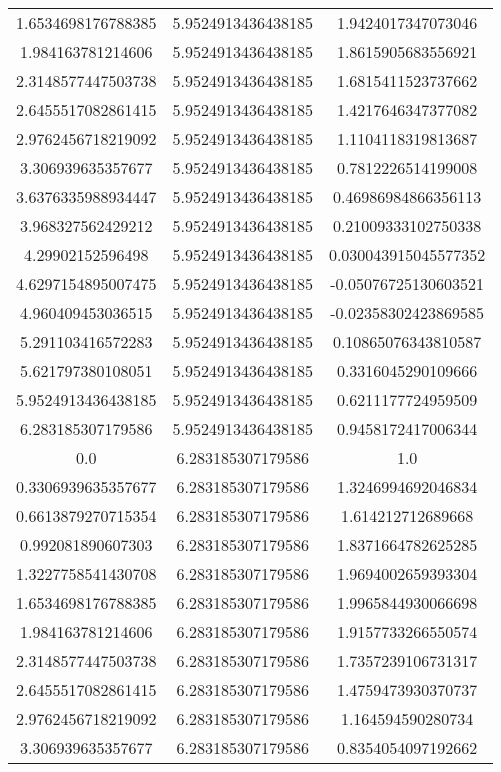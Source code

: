 \begin{table}
\begin{tabular}{ccc}
1.6534698176788385 & 5.9524913436438185 & 1.9424017347073046 \\
1.984163781214606 & 5.9524913436438185 & 1.8615905683556921 \\
2.3148577447503738 & 5.9524913436438185 & 1.6815411523737662 \\
2.6455517082861415 & 5.9524913436438185 & 1.4217646347377082 \\
2.9762456718219092 & 5.9524913436438185 & 1.1104118319813687 \\
3.306939635357677 & 5.9524913436438185 & 0.7812226514199008 \\
3.6376335988934447 & 5.9524913436438185 & 0.46986984866356113 \\
3.968327562429212 & 5.9524913436438185 & 0.21009333102750338 \\
4.29902152596498 & 5.9524913436438185 & 0.030043915045577352 \\
4.6297154895007475 & 5.9524913436438185 & -0.05076725130603521 \\
4.960409453036515 & 5.9524913436438185 & -0.02358302423869585 \\
5.291103416572283 & 5.9524913436438185 & 0.10865076343810587 \\
5.621797380108051 & 5.9524913436438185 & 0.3316045290109666 \\
5.9524913436438185 & 5.9524913436438185 & 0.6211177724959509 \\
6.283185307179586 & 5.9524913436438185 & 0.9458172417006344 \\
0.0 & 6.283185307179586 & 1.0 \\
0.3306939635357677 & 6.283185307179586 & 1.3246994692046834 \\
0.6613879270715354 & 6.283185307179586 & 1.614212712689668 \\
0.992081890607303 & 6.283185307179586 & 1.8371664782625285 \\
1.3227758541430708 & 6.283185307179586 & 1.9694002659393304 \\
1.6534698176788385 & 6.283185307179586 & 1.9965844930066698 \\
1.984163781214606 & 6.283185307179586 & 1.9157733266550574 \\
2.3148577447503738 & 6.283185307179586 & 1.7357239106731317 \\
2.6455517082861415 & 6.283185307179586 & 1.4759473930370737 \\
2.9762456718219092 & 6.283185307179586 & 1.164594590280734 \\
3.306939635357677 & 6.283185307179586 & 0.8354054097192662 \\

\end{tabular}
\end{table}
